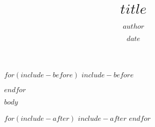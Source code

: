 \documentclass[12pt,a4paper]{book}
\author{$author$}
\title{$title$}
\date{$date$}
\begin{document}
\frontmatter
{}

%





$for(include-before)$
$include-before$

$endfor$

\tableofcontents
\listoffigures
\listoftables



\mainmatter

$body$

\printbibliography

\backmatter

$for(include-after)$
$include-after$
$endfor$
\end{document}
